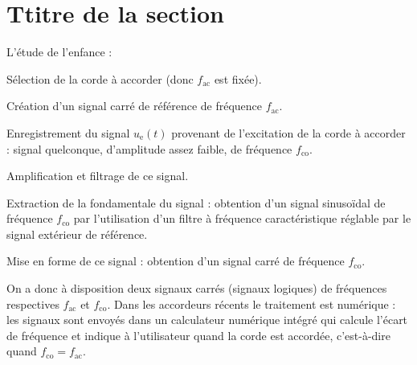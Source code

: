 \documentclass[a4paper,french,bookmarks]{article}
\begin{document}

\section{Ttitre de la section}

L'étude de l'enfance : 
\hfill
\begin{enumerate}
	\itt Sélection de la corde à accorder (donc $f_\text{ac}$ est fixée).
	
	\itt Création d'un signal carré de référence de fréquence $f_\text{ac}$.
	
	\itt Enregistrement du signal $u_\text{e}(t)$ provenant de l'excitation de
	la corde à accorder : signal quelconque, d'amplitude assez faible,
	de fréquence $f_\text{co}$.
	
	\itt Amplification et filtrage de ce signal.
	
	\itt Extraction de la fondamentale du signal : obtention d'un signal
	sinusoïdal de fréquence $f_\text{co}$ par l'utilisation d'un filtre à
	fréquence caractéristique réglable par le signal extérieur de
	référence.
	
	\itt Mise en forme de ce signal : obtention d'un signal carré de
	fréquence $f_\text{co}$.
	
	\itt On a donc à disposition deux signaux carrés (signaux logiques)
	de fréquences respectives $f_\text{ac}$ et $f_\text{co}$. Dans les accordeurs
	récents le traitement est numérique : les signaux sont envoyés dans un
	calculateur numérique intégré qui calcule l'écart de fréquence et
	indique à l'utilisateur quand la corde est accordée, c'est-à-dire
	quand $f_\text{co}=f_\text{ac}$.
\end{enumerate}
\end{document}

